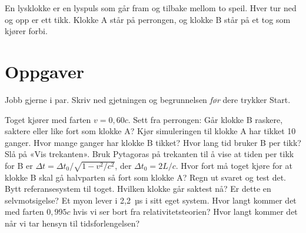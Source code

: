 \documentclass[11pt]{article}
\begin{document}

En lysklokke er en lyspuls som går fram og tilbake mellom to speil. Hver tur ned og opp er ett tikk. Klokke A står på perrongen, og klokke B står på et tog som kjører forbi.

\section*{Oppgaver}

Jobb gjerne i par. Skriv ned gjetningen og begrunnelsen \emph{før} dere trykker Start.

\begin{oppgaveliste}
\oppgave {}Toget kjører med farten $v = 0{,}60c$. Sett fra perrongen: Går klokke B raskere, saktere eller like fort som klokke A?
\svar
\oppgave {}Kjør simuleringen til klokke A har tikket 10 ganger. Hvor mange ganger har klokke B tikket? Hvor lang tid bruker B per tikk?
\svar
\oppgave {}Slå på «Vis trekanten». Bruk Pytagoras på trekanten til å vise at tiden per tikk for B er $Δt = Δt_{0} / \sqrt{1 - v^{2}/c^{2}}$, der $Δt_{0} = 2L/c$.
\svar
\oppgave {}Hvor fort må toget kjøre for at klokke B skal gå halvparten så fort som klokke A? Regn ut svaret og test det.
\svar
\oppgave {}Bytt referansesystem til toget. Hvilken klokke går saktest nå? Er dette en selvmotsigelse?
\svar
\oppgave {}Et myon lever i 2,2~µs i sitt eget system. Hvor langt kommer det med farten $0{,}995c$ hvis vi ser bort fra relativitetsteorien? Hvor langt kommer det når vi tar hensyn til tidsforlengelsen?
\svar
\end{oppgaveliste}
\end{document}
